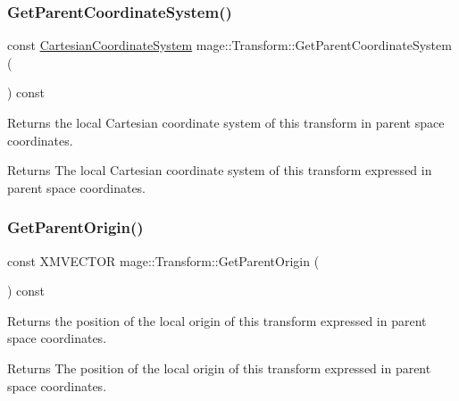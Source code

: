 \subsubsection{\texorpdfstring{Get\+Parent\+Coordinate\+System()}{GetParentCoordinateSystem()}}
{\footnotesize\ttfamily const \hyperlink{structmage_1_1_cartesian_coordinate_system}{Cartesian\+Coordinate\+System} mage\+::\+Transform\+::\+Get\+Parent\+Coordinate\+System (\begin{DoxyParamCaption}{ }\end{DoxyParamCaption}) const\hspace{0.3cm}{\ttfamily [noexcept]}}

Returns the local Cartesian coordinate system of this transform in parent space coordinates.

\begin{DoxyReturn}{Returns}
The local Cartesian coordinate system of this transform expressed in parent space coordinates. 
\end{DoxyReturn}
\hypertarget{classmage_1_1_transform_ac15f904c1b365583513a8827c483ff21}{}\label{classmage_1_1_transform_ac15f904c1b365583513a8827c483ff21} 
\subsubsection{\texorpdfstring{Get\+Parent\+Origin()}{GetParentOrigin()}}
{\footnotesize\ttfamily const X\+M\+V\+E\+C\+T\+OR mage\+::\+Transform\+::\+Get\+Parent\+Origin (\begin{DoxyParamCaption}{ }\end{DoxyParamCaption}) const\hspace{0.3cm}{\ttfamily [noexcept]}}

Returns the position of the local origin of this transform expressed in parent space coordinates.

\begin{DoxyReturn}{Returns}
The position of the local origin of this transform expressed in parent space coordinates. 
\end{DoxyReturn}
\hypertarget{classmage_1_1_transform_afbe8535cd6616d92d1107c6baff78125}{}\label{classmage_1_1_transform_afbe8535cd6616d92d1107c6baff78125} 
